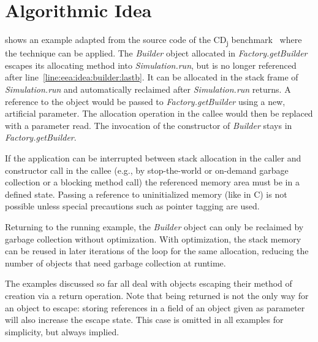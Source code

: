 	\section{Algorithmic Idea}
		\label{sec:eea:idea}
		 shows an example adapted from the source code of the CD\textsubscript{j}
		benchmark~\cite{kalibera:09:jtres} where the technique can be applied. The \emph{Builder} object allocated in
		\emph{Factory.getBuilder} escapes its allocating method into \emph{Simulation.run}, but is no longer referenced
		after line~\ref{line:eea:idea:builder:lastb}. It can be allocated in the stack frame of \emph{Simulation.run} and
		automatically reclaimed after \emph{Simulation.run} returns. A reference to the object would be passed to
		\emph{Factory.getBuilder} using a new, artificial parameter. The allocation operation in the callee would then be
		replaced with a parameter read. The invocation of the constructor of \emph{Builder} stays in
		\emph{Factory.getBuilder}.

		If the application can be interrupted between stack allocation in the caller and constructor call in the callee
		(e.g., by stop-the-world or on-demand garbage collection or a blocking method call) the referenced memory area must
		be in a defined state. Passing a reference to uninitialized memory (like in C) is not possible unless special
		precautions such as pointer tagging are used.

		Returning to the running example, the \emph{Builder} object can only be reclaimed by garbage collection without
		optimization. With optimization, the stack memory can be reused in later iterations of the loop for the same
		allocation, reducing the number of objects that need garbage collection at runtime.

		The examples discussed so far all deal with objects escaping their method of creation via a return operation. Note
		that being returned is not the only way for an object to escape: storing references in a field of an object given as
		parameter will also increase the escape state. This case is omitted in all examples for simplicity, but always
		implied.

